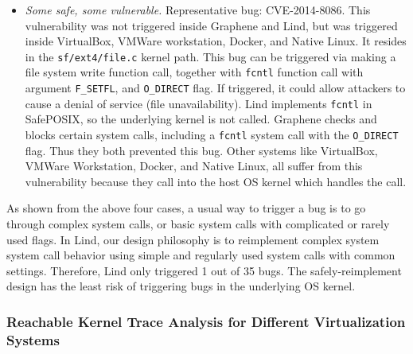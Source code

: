 \begin{itemize}
\item \emph{Some safe, some vulnerable.}  Representative bug: CVE-2014-8086.
This vulnerability was not triggered inside Graphene and Lind, but was triggered inside
VirtualBox, VMWare workstation, Docker, and Native Linux. It resides in the \texttt{sf/ext4/file.c} kernel path. 
This bug can be triggered via making a file system write function call, together with \texttt{fcntl} function call
with argument \texttt{F\_SETFL}, and \texttt{O\_DIRECT} flag. If triggered, it could allow attackers to cause
a denial of service (file unavailability). Lind implements \texttt{fcntl}
in SafePOSIX, so the underlying kernel is not called.
Graphene checks and blocks certain system calls, including
a \texttt{fcntl} system call with the \texttt{O\_DIRECT} flag.
Thus they both prevented this bug. Other systems like VirtualBox, VMWare Workstation, Docker, and Native Linux,
all suffer from this vulnerability because they call into the host OS
kernel which handles the call.

\end{itemize}

As shown from the above four cases, a usual way to trigger a bug is to go through complex system calls,
or basic system calls with complicated or rarely used flags. In Lind, our
design philosophy is to reimplement complex system system call behavior
using simple and regularly used system calls with common settings.
Therefore, Lind only triggered
1 out of 35 bugs.  The safely-reimplement design
has the least risk of triggering bugs in the underlying OS kernel.

\subsubsection{Reachable Kernel Trace Analysis for Different Virtualization
Systems}
\label{Reachable-Kernel-Trace-Analysis-for-Different-Virtualization-Systems}

